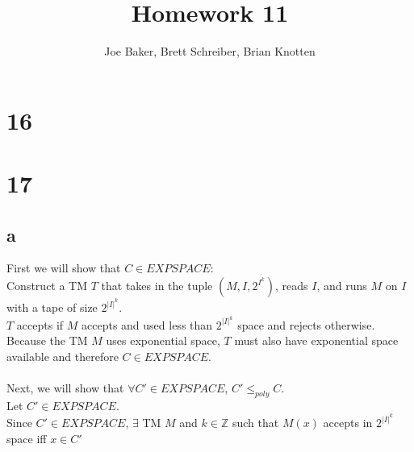\documentclass[letterpaper,notitlepage,twoside]{article}
\newcommand{\Z}{\mathbb{Z}} %
\begin{document}
\title{Homework 11}
\author{Joe Baker, Brett Schreiber, Brian Knotten}
\maketitle

\section*{16}

\section*{17}
\subsection*{a}
First we will show that $C \in EXPSPACE$:\\ 
Construct a TM $T$ that takes in the tuple $(M, I, 2^{I^{k}})$, reads $I$, and runs $M$ on $I$ with a tape of size $2^{|I|^{k}}$. \\ 
$T$ accepts if $M$ accepts and used less than $2^{|I|^{k}}$ space and rejects otherwise. \\
Because the TM $M$ uses exponential space, $T$ must also have exponential space available and therefore $C \in EXPSPACE$. \\ \\ 
Next, we will show that $\forall C' \in EXPSPACE$, $C' \leq_{poly} C$. \\
Let $C' \in EXPSPACE$. \\
Since $C' \in EXPSPACE$, $\exists$ TM $M$ and $k \in \Z$ such that $M(x)$ accepts in $2^{|I|^{k}}$ space iff $x \in C'$
\end{document}
